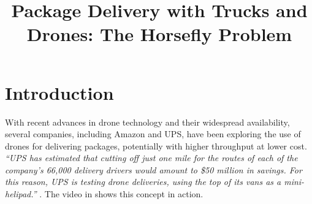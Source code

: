\documentclass[conference]{IEEEtran}
\newcommand{\old}[1]{{}}
\begin{document}
\title{Package Delivery with Trucks and Drones: The Horsefly Problem \vspace{-1ex}}
\author{
\and
{}
}

\maketitle

\old{
  \begin{abstract}
Let $S=\{p_1,\ldots,p_n\}$ be a given set of $n$ customer sites in $\mathbb{R}^2$. A truck full of packages starts at point $s$ (the depot) and has a delivery drone on its rooftop. The drone can carry one package at a time to a customer, then return to the truck for another package.  The drone flies at speed 1, while the truck travels at (slower) speed $1/\varphi$, for a speed ratio $\varphi>1$.
The goal is to compute a route for the truck and for the drone in order to complete the delivery of all $n$ packages (and have the drone return back to the empty truck) as soon as possible -- i.e., we seek to minimize the {\em makespan} of the delivery process.
We describe algorithms to address this optimal delivery problem. We give both provable approximation results (an $O(\log n)$-approximation algorithm) and some experimental results comparing some heuristics.
\end{abstract}
}

\section{Introduction}

With recent advances in drone technology and their widespread
availability, several companies, including Amazon and UPS, have been
exploring the use of drones for delivering packages, potentially with
higher throughput at lower cost.  \textit{``UPS has estimated
  that cutting off just one mile for the routes of each of the
  company's 66,000 delivery drivers would amount to \$50 million in
  savings. For this reason, UPS is testing drone deliveries, using the
  top of its vans as a mini-helipad.''} \cite{dronepromise}. The video
in \cite{youtube} shows this concept in action.
\end{document}
